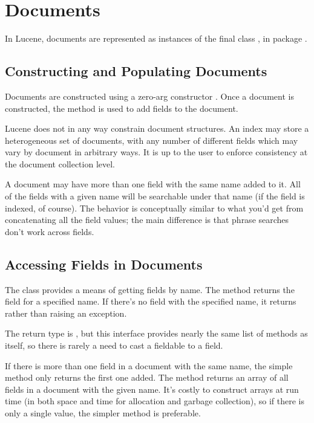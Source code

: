 \section{Documents}

In Lucene, documents are represented as instances of the final class
, in package .

\subsection{Constructing and Populating Documents} 

Documents are constructed using a zero-arg constructor
.  Once a document is constructed, the method
 is used to add fields to the document.

Lucene does not in any way constrain document structures.  An index
may store a heterogeneous set of documents, with any number of
different fields which may vary by document in arbitrary ways.  It is
up to the user to enforce consistency at the document collection
level.  

A document may have more than one field with the same name added to
it.  All of the fields with a given name will be searchable under that
name (if the field is indexed, of course).  The behavior is
conceptually similar to what you'd get from concatenating all the
field values; the main difference is that phrase searches
don't work across fields.

\subsection{Accessing Fields in Documents}

The  class provides a means of getting fields by name.
The method  returns the field for a
specified name.  If there's no field with the specified name, it
returns  rather than raising an exception.

The return type is , but this interface provides
nearly the same list of methods as  itself, so there is
rarely a need to cast a fieldable to a field.  

If there is more than one field in a document with the same name, the
simple method  only returns the first one
added.  The method  returns an array of
all fields in a document with the given name.  It's costly to
construct arrays at run time (in both space and time for allocation
and garbage collection), so if there is only a single value, the
simpler method is preferable.



